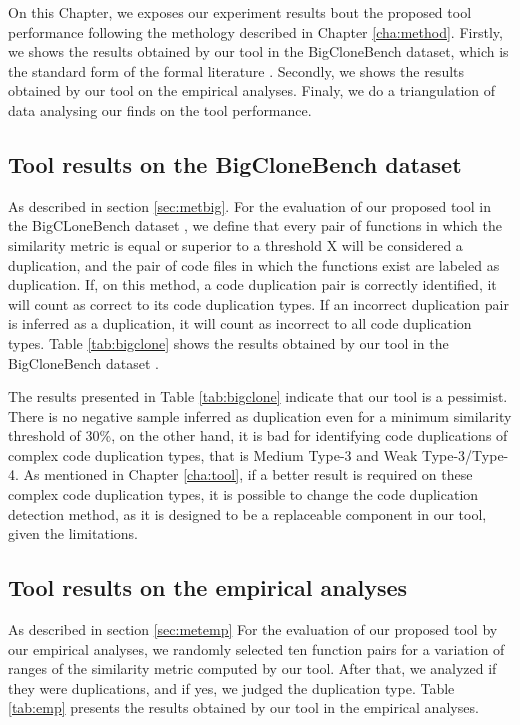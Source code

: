 On this Chapter, we exposes our experiment results bout the proposed tool performance following
the methology described in Chapter \ref{cha:method}. Firstly, we shows the results obtained by our tool
in the BigCloneBench dataset\citep{bigclonebench}, which is the standard form of the formal literature 
\citep{litreview}. Secondly, we shows the results obtained by our tool on the empirical analyses. 
Finaly, we do a triangulation of data analysing our finds on the tool performance.

\subsection{Tool results on the BigCloneBench dataset}



As described in section \ref{sec:metbig}. For the evaluation of our proposed tool in the
BigCLoneBench dataset  \citep{bigclonebench}, we define that every pair of functions in which the 
similarity metric is equal or superior to a threshold X will be considered a duplication, and the 
pair of code files in which the functions exist are labeled as duplication. If, on this method, 
a code duplication pair is correctly identified, it will count as correct to its code duplication 
types. If an incorrect duplication pair is inferred as a duplication, it will count as incorrect 
to all code duplication types. Table \ref{tab:bigclone} shows the results obtained by our tool in the 
BigCloneBench dataset \citep{bigclonebench}.

The results presented in Table \ref{tab:bigclone} indicate that our tool is a pessimist. There 
is no negative sample inferred as duplication even for a minimum similarity threshold of 30\%, 
on the other hand, it is bad for identifying code duplications of complex code duplication types, 
that is Medium Type-3 and Weak Type-3/Type-4. As mentioned in Chapter \ref{cha:tool}, if a 
better result is required on these complex code duplication types, it is possible to change 
the code duplication detection method, as it is designed to be a replaceable component in our 
tool, given the limitations.

\subsection{Tool results on the empirical analyses}

As described in section \ref{sec:metemp} For the evaluation of our proposed tool by our empirical 
analyses, we randomly selected ten function pairs for a variation of ranges of the similarity 
metric computed by our tool. After that, we analyzed if they were duplications, and if yes, 
we judged the duplication type. Table \ref{tab:emp} presents the results obtained by our tool 
in the empirical analyses.

